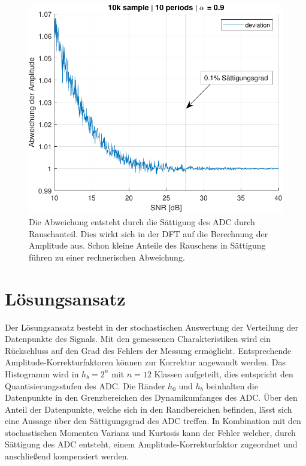  \begin{figure}[h!] 
	\centering 
	\includegraphics[width=.8\columnwidth]{../img/noise-err.pdf}
	\caption{Die Abweichung entsteht durch die Sättigung des ADC durch Rauschanteil. Dies wirkt sich in der DFT auf die Berechnung der Amplitude aus. Schon kleine Anteile des Rauschens in Sättigung führen zu einer rechnerischen Abweichung.}
	\label{fig:Rauschanteil}
\end{figure}

\section{Lösungsansatz} 

Der Lösungsansatz besteht in der stochastischen Auswertung der Verteilung der Datenpunkte des Signals. Mit den gemessenen Charakteristiken wird ein Rückschluss auf den Grad des Fehlers der Messung ermöglicht. Entsprechende Amplitude-Korrekturfaktoren können zur Korrektur angewandt werden. Das Histogramm wird in $h_b = 2^n$ mit $n = 12$ Klassen aufgeteilt, dies entspricht den Quantisierungsstufen des ADC. Die Ränder $h_0$ und $h_b$ beinhalten die Datenpunkte in den Grenzbereichen des Dynamikumfanges des ADC. Über den Anteil der Datenpunkte, welche sich in den Randbereichen befinden, lässt sich eine Aussage über den Sättigungsgrad des ADC treffen. In Kombination mit den stochastischen Momenten Varianz und Kurtosis kann der Fehler welcher, durch Sättigung des ADC entsteht, einem Amplitude-Korrekturfaktor zugeordnet und anschließend kompensiert werden.  

